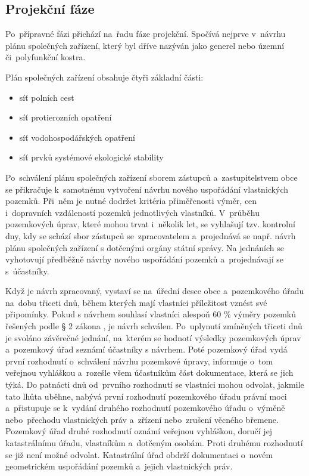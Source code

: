 \subsection{Projekční fáze}
\label{projekcni_faze}

Po~přípravné fázi přichází na~řadu fáze projekční. Spočívá nejprve
v~návrhu plánu společných zařízení, který byl dříve nazýván jako
generel nebo územní či~polyfunkční kostra.

Plán společných zařízení obsahuje čtyři základní části:
\vspace{-\topsep}
	\begin{itemize}[leftmargin=1.5cm, noitemsep]
		\item síť polních cest
		\item síť protierozních opatření
		\item síť vodohospodářských opatření
		\item síť prvků systémové ekologické stability
	\end{itemize}

Po~schválení plánu společných zařízení sborem zástupců
a~zastupitelstvem obce se přikračuje k~samotnému vytvoření návrhu
nového uspořádání vlastnických pozemků. Při~něm je nutné dodržet
kritéria přiměřenosti výměr, cen i~dopravních vzdáleností pozemků
jednotlivých vlastníků. V~průběhu pozemkových úprav, které mohou trvat
i~několik let, se vyhlašují tzv. kontrolní dny, kdy se schází sbor
zástupců se~zpraco\-vatelem a~projednává se např. návrh plánu
společných zařízení s dotčenými orgány státní správy. Na jednáních
se vyhotovují předběžně návrhy nového uspořádání pozemků a~projednávají se
s~účastníky.

Když je návrh zpracovaný, vystaví se na~úřední desce obce
a~pozemkového úřadu na~dobu třiceti dnů, během kterých mají vlastníci
příležitost vznést své připomínky. Pokud s návrhem souhlasí vlastníci
alespoň 60 \% výměry pozemků řešených podle § 2 zákona \citep{pu_zakon},
je návrh schválen. Po~uplynutí zmíněných třiceti dnů je svoláno
závěrečné jednání, na~kterém se hodnotí výsledky pozemkových úprav
a~pozemkový úřad seznámí účastníky s návrhem. Poté pozemkový úřad vydá
první rozhodnutí o~schválení návrhu pozemkové úpravy, informuje o~tom
veřejnou vyhláškou a~rozešle všem účastníkům část dokumentace, která
se jich týká. Do patnácti dnů od~prvního rozhodnutí se vlastníci mohou
odvolat, jakmile tato lhůta uběhne, nabývá první rozhodnutí pozemkového
úřadu právní moci a~přistupuje se k~vydání druhého rozhodnutí pozemkového
úřadu o~výměně nebo~přechodu vlastnických práv a~zřízení nebo~zrušení věcného
břemene. Pozemkový úřad druhé rozhodnutí oznámí veřejnou vyhláškou,
doručí jej katastrálnímu úřadu, vlastníkům a~dotčeným osobám. Proti
druhému rozhodnutí se již není možné odvolat. Kata\-strální úřad
obdrží dokumentaci o~novém geometrickém uspořádání pozemků a~jejich
vlastnických práv.


